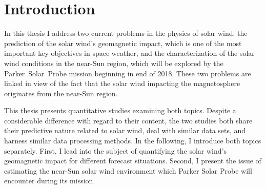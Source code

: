 
\chapter{Introduction}
\label{chap:introduction}

In this thesis I address two current problems in the physics of solar wind: the prediction of the solar wind's geomagnetic impact, which is one of the most important key objectives in space weather, and the characterization of the solar wind conditions in the near-Sun region, which will be explored by the Parker~Solar~Probe mission beginning in end of 2018. These two problems are linked in view of the fact that the solar wind impacting the magnetosphere originates from the near-Sun region.

This thesis presents quantitative studies examining both topics. Despite a considerable difference with regard to their content, the two studies both share their predictive nature related to solar wind, deal with similar data sets, and harness similar data processing methods.
In the following, I introduce both topics separately. First, I lead into the subject of quantifying the solar wind's geomagnetic impact for different forecast situations. Second, I present the issue of estimating the near-Sun solar wind environment which Parker Solar Probe will encounter during its mission.

\bigskip


